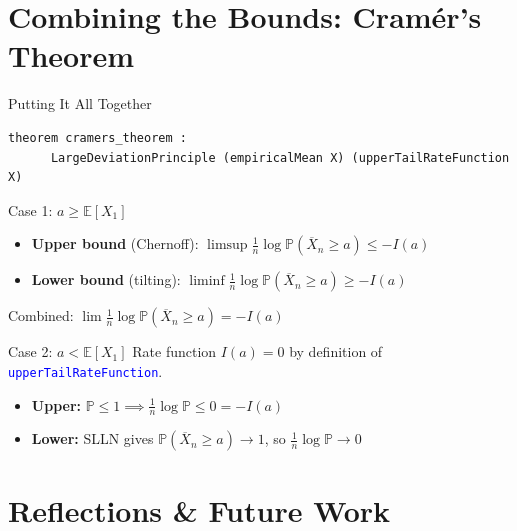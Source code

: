 \documentclass[aspectratio=169]{beamer}
\newcommand{\E}{\mathbb{E}}
\renewcommand{\P}{\mathbb{P}}
\newcommand{\leancode}[1]{\textcolor{blue}{\nolinkurl{#1}}}
\begin{document}
\section{Combining the Bounds: Cram\'er's Theorem}

\begin{frame}[fragile]{Putting It All Together}
  \begin{lstlisting}[basicstyle=\ttfamily\scriptsize]
  theorem cramers_theorem :
      LargeDeviationPrinciple (empiricalMean X) (upperTailRateFunction X)
  \end{lstlisting}
  \begin{block}{Case 1: $a \ge \E[X_1]$}
    \begin{itemize}
      \item \textbf{Upper bound} (Chernoff): $\limsup \frac{1}{n}\log\P(\overline{X}_n \ge a) \le -I(a)$
      \item \textbf{Lower bound} (tilting): $\liminf \frac{1}{n}\log\P(\overline{X}_n \ge a) \ge -I(a)$
    \end{itemize}
    Combined: $\lim \frac{1}{n}\log\P(\overline{X}_n \ge a) = -I(a)$
  \end{block}

  \begin{block}{Case 2: $a < \E[X_1]$}
    Rate function $I(a) = 0$ by definition of \leancode{upperTailRateFunction}.
    \begin{itemize}
      \item \textbf{Upper:} $\P \le 1 \implies \frac{1}{n}\log\P \le 0 = -I(a)$
      \item \textbf{Lower:} SLLN gives $\P(\overline{X}_n \ge a) \to 1$, so $\frac{1}{n}\log\P \to 0$
    \end{itemize}
  \end{block}
\end{frame}

\section{Reflections \& Future Work}
\end{document}
